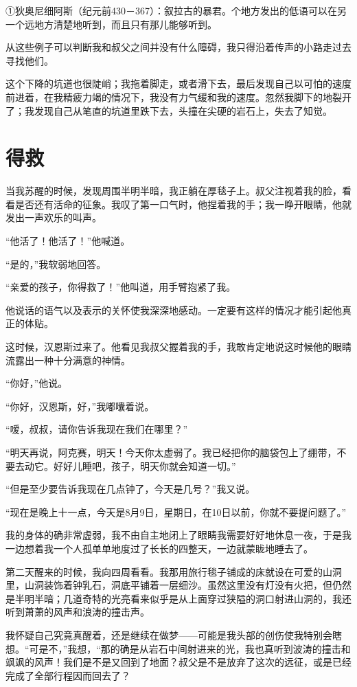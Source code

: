 \documentclass[10pt]{book}
\begin{document}
①狄奥尼细阿斯（纪元前430－367）：叙拉古的暴君。个地方发出的低语可以在另一个远地方清楚地听到，而且只有那儿能够听到。

从这些例子可以判断我和叔父之间并没有什么障碍，我只得沿着传声的小路走过去寻找他们。

这个下降的坑道也很陡峭；我拖着脚走，或者滑下去，最后发现自己以可怕的速度前进着，在我精疲力竭的情况下，我没有力气缓和我的速度。忽然我脚下的地裂开了；我发现自己从笔直的坑道里跌下去，头撞在尖硬的岩石上，失去了知觉。
\chapter{得救}
当我苏醒的时候，发现周围半明半暗，我正躺在厚毯子上。叔父注视着我的脸，看看是否还有活命的征象。我叹了第一口气时，他捏着我的手；我一睁开眼睛，他就发出一声欢乐的叫声。

“他活了！他活了！”他喊道。

“是的，”我软弱地回答。

“亲爱的孩子，你得救了！”他叫道，用手臂抱紧了我。

他说话的语气以及表示的关怀使我深深地感动。一定要有这样的情况才能引起他真正的体贴。

这时候，汉恩斯过来了。他看见我叔父握着我的手，我敢肯定地说这时候他的眼睛流露出一种十分满意的神情。

“你好，”他说。

“你好，汉恩斯，好，”我嘟囔着说。

“嗳，叔叔，请你告诉我现在我们在哪里？”

“明天再说，阿克赛，明天！今天你太虚弱了。我已经把你的脑袋包上了绷带，不要去动它。好好儿睡吧，孩子，明天你就会知道一切。”

“但是至少要告诉我现在几点钟了，今天是几号？”我又说。

“现在是晚上十一点，今天是8月9日，星期日，在10日以前，你就不要提问题了。”

我的身体的确非常虚弱，我不由自主地闭上了眼睛我需要好好地休息一夜，于是我一边想着我一个人孤单单地度过了长长的四整天，一边就蒙眬地睡去了。

第二天醒来的时候，我向四周看看。我那用旅行毯子铺成的床就设在可爱的山洞里，山洞装饰着钟乳石，洞底平铺着一层细沙。虽然这里没有灯没有火把，但仍然是半明半暗；几道奇特的光亮看来似乎是从上面穿过狭隘的洞口射进山洞的，我还听到萧萧的风声和浪涛的撞击声。

我怀疑自己究竟真醒着，还是继续在做梦——可能是我头部的创伤使我特别会瞎想。“可是不，”我想，“那的确是从岩石中间射进来的光，我也真听到波涛的撞击和飒飒的风声！我们是不是又回到了地面？叔父是不是放弃了这次的远征，或是已经完成了全部行程因而回去了？
\end{document}
